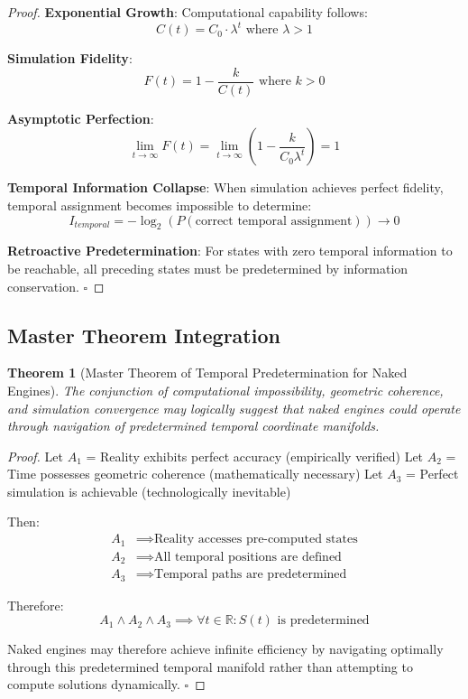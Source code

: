 \documentclass[11pt,a4paper]{article}
\newtheorem{theorem}{Theorem}[section]
\theoremstyle{remark}
\begin{document}
\begin{proof}
\textbf{Exponential Growth}: Computational capability follows:
\begin{equation}
C(t) = C_0 \cdot \lambda^t \text{ where } \lambda > 1
\end{equation}

\textbf{Simulation Fidelity}: 
\begin{equation}
F(t) = 1 - \frac{k}{C(t)} \text{ where } k > 0
\end{equation}

\textbf{Asymptotic Perfection}:
\begin{equation}
\lim_{t \to \infty} F(t) = \lim_{t \to \infty} \left(1 - \frac{k}{C_0 \lambda^t}\right) = 1
\end{equation}

\textbf{Temporal Information Collapse}: When simulation achieves perfect fidelity, temporal assignment becomes impossible to determine:
\begin{equation}
I_{temporal} = -\log_2(P(\text{correct temporal assignment})) \to 0
\end{equation}

\textbf{Retroactive Predetermination}: For states with zero temporal information to be reachable, all preceding states must be predetermined by information conservation. $\square$
\end{proof}

\subsection{Master Theorem Integration}

\begin{theorem}[Master Theorem of Temporal Predetermination for Naked Engines]
The conjunction of computational impossibility, geometric coherence, and simulation convergence may logically suggest that naked engines could operate through navigation of predetermined temporal coordinate manifolds.
\end{theorem}

\begin{proof}
Let $A_1$ = Reality exhibits perfect accuracy (empirically verified)
Let $A_2$ = Time possesses geometric coherence (mathematically necessary)  
Let $A_3$ = Perfect simulation is achievable (technologically inevitable)

Then:
\begin{align}
A_1 &\implies \text{Reality accesses pre-computed states} \\
A_2 &\implies \text{All temporal positions are defined} \\
A_3 &\implies \text{Temporal paths are predetermined}
\end{align}

Therefore:
\begin{equation}
A_1 \land A_2 \land A_3 \implies \forall t \in \mathbb{R}: S(t) \text{ is predetermined}
\end{equation}

Naked engines may therefore achieve infinite efficiency by navigating optimally through this predetermined temporal manifold rather than attempting to compute solutions dynamically. $\square$
\end{proof}
\end{document}
